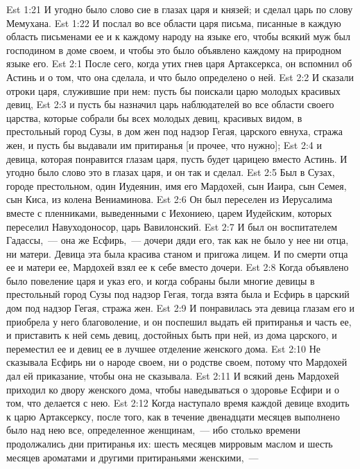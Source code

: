 \vs Est 1:21 И угодно было слово сие в глазах царя и князей; и сделал царь по слову Мемухана.
\vs Est 1:22 И послал во все области царя письма, писанные в каждую область письменами ее и к каждому народу на языке его, чтобы всякий муж был господином в доме своем, и чтобы это было объявлено каждому на природном языке его.
\vs Est 2:1 После сего, когда утих гнев царя Артаксеркса, он вспомнил об Астинь и о том, что она сделала, и что было определено о ней.
\vs Est 2:2 И сказали отроки царя, служившие при нем: пусть бы поискали царю молодых красивых девиц,
\vs Est 2:3 и пусть бы назначил царь наблюдателей во все области своего царства, которые собрали бы всех молодых девиц, красивых видом, в престольный город Сузы, в дом жен под надзор Гегая, царского евнуха, стража жен, и пусть бы выдавали им притиранья [и прочее, что нужно];
\vs Est 2:4 и девица, которая понравится глазам царя, пусть будет царицею вместо Астинь. И угодно было слово это в глазах царя, и он так и сделал.
\rsbpar\vs Est 2:5 Был в Сузах, городе престольном, один Иудеянин, имя его Мардохей, сын Иаира, сын Семея, сын Киса, из колена Вениаминова.
\vs Est 2:6 Он был переселен из Иерусалима вместе с пленниками, выведенными с Иехониею, царем Иудейским, которых переселил Навуходоносор, царь Вавилонский.
\vs Est 2:7 И был он воспитателем Гадассы,~--- она же Есфирь,~--- дочери дяди его, так как не было у нее ни отца, ни матери. Девица эта была красива станом и пригожа лицем. И по смерти отца ее и матери ее, Мардохей взял ее к себе вместо дочери.
\rsbpar\vs Est 2:8 Когда объявлено было повеление царя и указ его, и когда собраны были многие девицы в престольный город Сузы под надзор Гегая, тогда взята была и Есфирь в царский дом под надзор Гегая, стража жен.
\vs Est 2:9 И понравилась эта девица глазам его и приобрела у него благоволение, и он поспешил выдать ей притиранья и  часть ее, и приставить к ней семь девиц, достойных быть при ней, из дома царского, и переместил ее и девиц ее в лучшее отделение женского дома.
\vs Est 2:10 Не сказывала Есфирь ни о народе своем, ни о родстве своем, потому что Мардохей дал ей приказание, чтобы она не сказывала.
\vs Est 2:11 И всякий день Мардохей приходил ко двору женского дома, чтобы наведываться о здоровье Есфири и о том, что делается с нею.
\rsbpar\vs Est 2:12 Когда наступало время каждой девице входить к царю Артаксерксу, после того, как в течение двенадцати месяцев выполнено было над нею все, определенное женщинам,~--- ибо столько времени продолжались дни притиранья их: шесть месяцев мирровым маслом и шесть месяцев ароматами и другими притираньями женскими,~---
